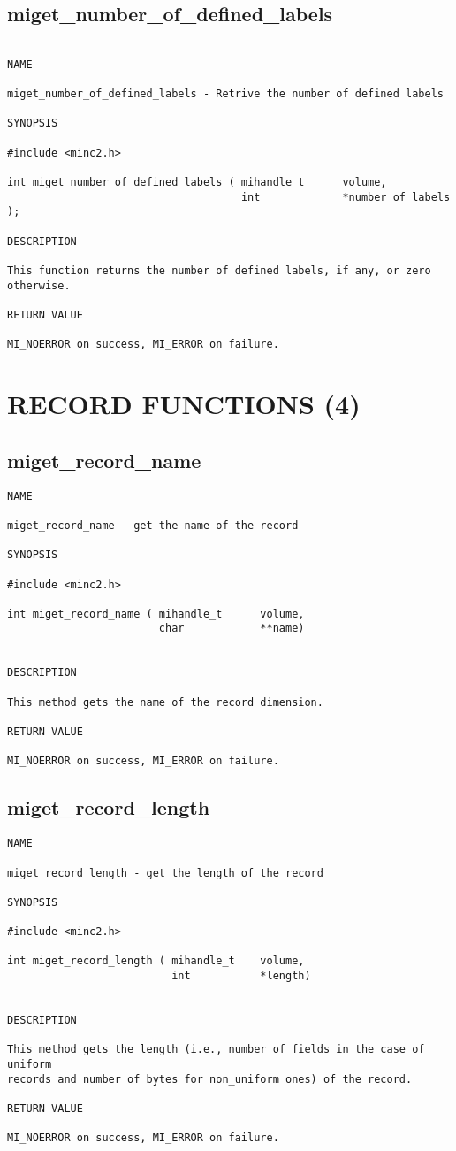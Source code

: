 \documentclass{article}
\begin{document}
\subsection{miget\_number\_of\_defined\_labels}
\begin{verbatim}

NAME

miget_number_of_defined_labels - Retrive the number of defined labels

SYNOPSIS

#include <minc2.h>

int miget_number_of_defined_labels ( mihandle_t      volume, 
                                     int             *number_of_labels );

DESCRIPTION

This function returns the number of defined labels, if any, or zero otherwise.

RETURN VALUE

MI_NOERROR on success, MI_ERROR on failure.
\end{verbatim}

\section{RECORD FUNCTIONS (4)}
\subsection{miget\_record\_name}
\begin{verbatim}
NAME

miget_record_name - get the name of the record

SYNOPSIS

#include <minc2.h>

int miget_record_name ( mihandle_t      volume,
                        char            **name)


DESCRIPTION

This method gets the name of the record dimension.

RETURN VALUE

MI_NOERROR on success, MI_ERROR on failure.
\end{verbatim}

\subsection{miget\_record\_length}
\begin{verbatim}
NAME

miget_record_length - get the length of the record

SYNOPSIS

#include <minc2.h>

int miget_record_length ( mihandle_t    volume,
                          int           *length)


DESCRIPTION

This method gets the length (i.e., number of fields in the case of uniform
records and number of bytes for non_uniform ones) of the record.

RETURN VALUE

MI_NOERROR on success, MI_ERROR on failure.
\end{verbatim}
\end{document}
